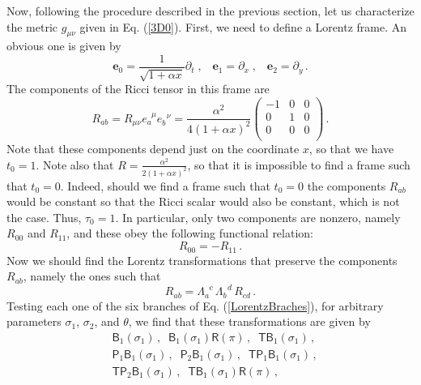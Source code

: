 \documentclass[twocolumn,prd,aps,showpacs,showkeys,amsmath,amssymb]{revtex4-1}
\newcommand{\bl}{\boldsymbol}
\begin{document}
Now, following the procedure described in the previous section, let us characterize the metric $g_{\mu\nu}$ given in Eq. (\ref{3D0}). First, we need to define a Lorentz frame. An obvious one is given by
\begin{equation*}
  \bl{e}_0 = \frac{1}{\sqrt{1+\alpha x}} \partial_t \;,\;\;\;
  \bl{e}_1 =   \partial_x \;,\;\;\;
  \bl{e}_2 =  \partial_y \,.
\end{equation*}
The components of the Ricci tensor in this frame are
\begin{equation*}
  R_{ab} = R_{\mu\nu}e_a^{\;\;\mu}  e_b^{\;\;\nu}  = \frac{\alpha^2}{4(1+\alpha x)^2}\left(
             \begin{array}{ccc}
               -1 & 0 & 0 \\
               0 & 1 & 0 \\
               0 & 0 & 0 \\
             \end{array}
           \right)\,.
\end{equation*}
Note that these components depend just on the coordinate $x$, so that we have $t_0=1$. Note also that $R = \frac{\alpha^2}{2(1+\alpha x)^2}$, so that it is impossible to find a frame such that $t_0=0$. Indeed, should we find a frame such that $t_0=0$ the components $R_{ab}$ would be constant so that the Ricci scalar would also be constant, which is not the case. Thus, $\tau_0=1$. In particular, only two components are nonzero, namely $R_{00}$ and $R_{11}$, and these obey the following functional relation:
\begin{equation}\label{FunRelR0-0}
  R_{00} = - R_{11} \,.
\end{equation}
Now we should find the Lorentz transformations that preserve the components $R_{ab}$, namely the ones such that
\begin{equation*}
  R_{ab} = \Lambda_a^{\;\;c} \,  \Lambda_b^{\;\;d} \, R_{cd}\,.
\end{equation*}
Testing each one of the six branches of Eq. (\ref{LorentzBraches}), for arbitrary parameters $\sigma_1$,  $\sigma_2$, and $\theta$, we find that these transformations are given by
\begin{align}
  &\textsf{B}_1(\sigma_1)  \,,\;\;  \textsf{B}_1(\sigma_1)  \textsf{R}(\pi)   \,,\;\;    \textsf{T} \textsf{B}_1(\sigma_1)  \,, \nonumber \\
&\textsf{P}_1 \textsf{B}_1(\sigma_1) \,,\;\;  \textsf{P}_2 \textsf{B}_1(\sigma_1) \,,\;\;   \textsf{T}  \textsf{P}_1 \textsf{B}_1(\sigma_1)   \,,  \label{H03D}\\
    & \textsf{T}  \textsf{P}_2 \textsf{B}_1(\sigma_1)  \,,\;\; \textsf{T} \textsf{B}_1(\sigma_1) \textsf{R}(\pi)\,, \nonumber
\end{align}
\end{document}
